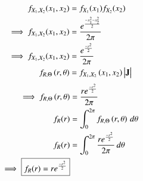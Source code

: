 \documentclass[journal,12pt,twocolumn]{IEEEtran}
\renewcommand\thesection{\arabic{section}}
\begin{document}
\begin{enumerate}[label=\thesection.\arabic*
,ref=\thesection.\theenumi]
\begin{enumerate}[label=\thesection.\arabic*
,ref=\thesection.\theenumi]
\begin{align}
		\end{align}
		\begin{align}
f_{X_1,X_2}(x_1,x_2)&=f_{X_1}(x_1)f_{X_2}(x_2)\\
\implies f_{X_1,X_2}(x_1,x_2)&=\frac{e^\frac{{-x_1^2-x_2^2}}{2}}{2\pi}\\
\implies f_{X_1,X_2}(x_1,x_2)&=\frac{e^\frac{{-r^2}}{2}}{2\pi}\\
f_{R, \Theta} \left(r, \theta\right) &= 
	f_{X_1,X_2}\left(x_1,x_2\right) \begin{vmatrix}\mathbf{J}\end{vmatrix}
	\end{align}
	\begin{align}
	\implies f_{R, \Theta} \left(r, \theta\right) &= \frac{re^\frac{{-r^2}}{2}}{2\pi}\\
	f_R(r) &= \int_{0}^{2\pi}
		f_{R, \Theta} \left(r, \theta\right) \, d\theta\\
		f_R(r) &= \int_{0}^{2\pi}
		\frac{re^\frac{{-r^2}}{2}}{2\pi} \, d\theta\\
		\implies \boxed{f_R(r)=re^{\frac{-r^2}{2}}}
\end{align}


\end{enumerate}
\end{enumerate}
\end{document}
